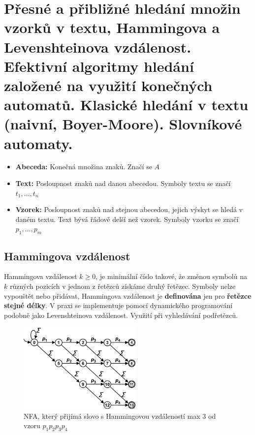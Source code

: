 \section[PAL - Vyhledávání v textu, automaty]{Přesné a přibližné hledání množin vzorků v textu, Hammingova a Levenshteinova vzdálenost. Efektivní algoritmy hledání založené na využití konečných automatů. Klasické hledání v textu (naivní, Boyer-Moore). Slovníkové automaty.}

\begin{itemize}
\item \textbf{Abeceda:} Konečná množina znaků. Značí se $A$
\item \textbf{Text:} Posloupnost znaků nad danou abecedou. Symboly textu se značí $t_1, \hdots, t_n$
\item \textbf{Vzorek:} Posloupnost znaků nad stejnou abecedou, jejich výskyt se hledá v daném textu. Text bývá řádově delší než vzorek. Symboly vzorku se značí $p_1, \hdots, p_m$
\end{itemize}

\subsection{Hammingova vzdálenost}
Hammingova vzdálenost $k \geq 0$, je minimální číslo takové, že změnou symbolů na $k$ různých pozicích v jednom z řetězců získáme druhý řetězec. Symboly nelze vypouštět nebo přidávat, Hammingova vzdálenost je \textbf{definována} jen pro \textbf{řetězce stejné délky}. V praxi se implementuje pomocí dynamického programování podobně jako Levenshteinova vzdálenost. Využití při vyhledávání podřetězců.

\begin{figure}[h]
    \begin{center}
        \includegraphics[width=60mm]{spolecne/04/images/hamming-automat}
    \end{center}
    \caption{NFA, který přijímá slovo s Hammingovou vzdáleností max 3 od vzoru $p_1p_2p_3p_4$}
\end{figure}

